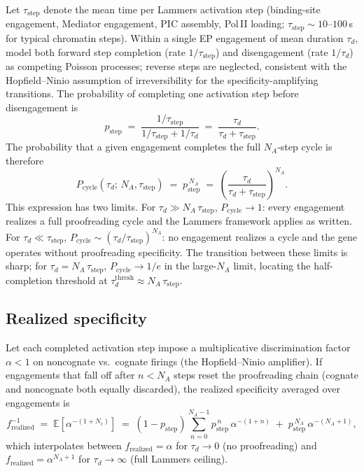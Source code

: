 \documentclass[11pt]{article}
\begin{document}
Let $\tau_{\mathrm{step}}$ denote the mean time per Lammers activation
step (binding-site engagement, Mediator engagement, PIC assembly,
Pol\,II loading; $\tau_{\mathrm{step}}\sim 10$--$100$\,s for typical
chromatin steps). Within a single EP engagement of mean duration
$\tau_d$, model both forward step completion (rate
$1/\tau_{\mathrm{step}}$) and disengagement (rate $1/\tau_d$) as competing
Poisson processes; reverse steps are neglected, consistent with the
Hopfield--Ninio assumption of irreversibility for the
specificity-amplifying transitions. The probability of completing one
activation step before disengagement is
\begin{equation}
  p_{\mathrm{step}}
  \;=\; \frac{1/\tau_{\mathrm{step}}}{1/\tau_{\mathrm{step}}+1/\tau_d}
  \;=\; \frac{\tau_d}{\tau_d + \tau_{\mathrm{step}}}.
  \label{eq:p_step}
\end{equation}
The probability that a given engagement completes the full $N_A$-step
cycle is therefore
\begin{equation}
  P_{\mathrm{cycle}}(\tau_d;\,N_A,\tau_{\mathrm{step}})
  \;=\; p_{\mathrm{step}}^{\,N_A}
  \;=\; \left(\frac{\tau_d}{\tau_d + \tau_{\mathrm{step}}}\right)^{\!N_A}.
  \label{eq:P_cycle}
\end{equation}
This expression has two limits. For $\tau_d \gg N_A\,\tau_{\mathrm{step}}$,
$P_{\mathrm{cycle}}\to 1$: every engagement realizes a full proofreading
cycle and the Lammers framework applies as written. For $\tau_d \ll
\tau_{\mathrm{step}}$, $P_{\mathrm{cycle}}\sim(\tau_d/\tau_{\mathrm{step}})^{N_A}$:
no engagement realizes a cycle and the gene operates without proofreading
specificity. The transition between these limits is sharp; for $\tau_d =
N_A\,\tau_{\mathrm{step}}$, $P_{\mathrm{cycle}}\to 1/e$ in the large-$N_A$
limit, locating the half-completion threshold at $\tau_d^{\mathrm{thresh}}
\approx N_A\,\tau_{\mathrm{step}}$.

\subsection{Realized specificity}

Let each completed activation step impose a multiplicative discrimination
factor~$\alpha < 1$ on noncognate vs.\ cognate firings (the
Hopfield--Ninio amplifier). If engagements that fall off after $n<N_A$
steps reset the proofreading chain (cognate and noncognate both equally
discarded), the realized specificity averaged over engagements is
\begin{equation}
  f_{\mathrm{realized}}^{-1}
  \;=\; \mathbb{E}\!\left[\alpha^{-(1+N_c)}\right]
  \;=\; (1-p_{\mathrm{step}})\sum_{n=0}^{N_A-1} p_{\mathrm{step}}^{\,n}\,\alpha^{-(1+n)}
  \;+\; p_{\mathrm{step}}^{\,N_A}\,\alpha^{-(N_A+1)},
  \label{eq:f_realized}
\end{equation}
which interpolates between $f_{\mathrm{realized}}=\alpha$ for
$\tau_d\to 0$ (no proofreading) and $f_{\mathrm{realized}}=\alpha^{N_A+1}$
for $\tau_d\to\infty$ (full Lammers ceiling).
\end{document}
